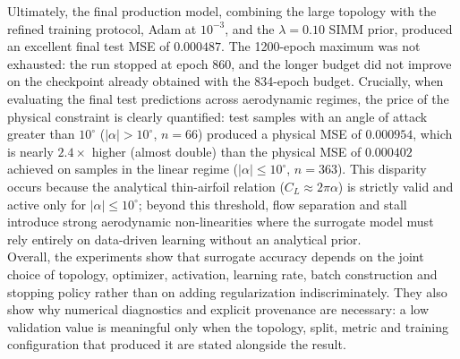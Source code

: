 Ultimately, the final production model, combining the large topology with the refined training protocol, Adam at $10^{-3}$, and the $\lambda=0.10$ SIMM prior, produced an excellent final test MSE of $0.000487$. The 1200-epoch maximum was not exhausted: the run stopped at epoch 860, and the longer budget did not improve on the checkpoint already obtained with the 834-epoch budget. Crucially, when evaluating the final test predictions across aerodynamic regimes, the price of the physical constraint is clearly quantified: test samples with an angle of attack greater than $10^\circ$ ($|\alpha|>10^\circ$, $n=66$) produced a physical MSE of $0.000954$, which is nearly $2.4\times$ higher (almost double) than the physical MSE of $0.000402$ achieved on samples in the linear regime ($|\alpha|\leq 10^\circ$, $n=363$). This disparity occurs because the analytical thin-airfoil relation ($C_L\approx 2\pi\alpha$) is strictly valid and active only for $|\alpha|\leq 10^\circ$; beyond this threshold, flow separation and stall introduce strong aerodynamic non-linearities where the surrogate model must rely entirely on data-driven learning without an analytical prior.\\

Overall, the experiments show that surrogate accuracy depends on the joint choice of topology, optimizer, activation, learning rate, batch construction and stopping policy rather than on adding regularization indiscriminately. They also show why numerical diagnostics and explicit provenance are necessary: a low validation value is meaningful only when the topology, split, metric and training configuration that produced it are stated alongside the result.